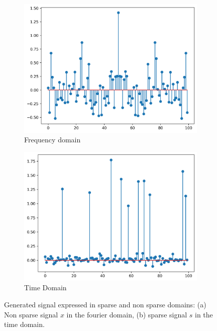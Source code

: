 \documentclass[11pt]{article}
\begin{document}
\begin{figure} [H]
    \centering
    \begin{subfigure}{.45\textwidth}
        \centering
        \includegraphics[width=\linewidth]{figs/q2b_original_sparse_signal_fft.png}
        \caption{Frequency domain}
        \label{fig:sparse_signal_fourier}
    \end{subfigure}%
    \begin{subfigure}{.45\textwidth}
        \centering
        \includegraphics[width=\linewidth]{figs/q2b_original_sparse_signal.png}
        \caption{Time Domain}
        \label{fig:sparse_signal}
    \end{subfigure}%

    \caption{Generated signal expressed in sparse and non sparse domains: (a) Non sparse signal \( x\) in the fourier domain, (b) sparse signal \( s \) in the time domain.}
    \label{fig:compressed_sensing_signal}
\end{figure}
\end{document}

